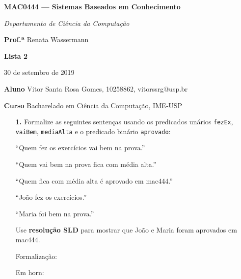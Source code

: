 \documentclass[10pt, twoside]{article}          %
\let\oldphantom\vphantom
\let\vphantom\relax
\let\vphantom\oldphantom
\newcommand{\vghost}[1]{{%
  \delimitershortfall=-1pt
  \vphantom{
    \begingroup
    \lccode`m=`(\relax
    \lowercase\expandafter{\romannumeral#1000}%
    \lccode`m=`)\relax
    \lowercase\expandafter{\romannumeral#1000}%
    \endgroup
  }
}}
\renewcommand{\l}{\mathopen{}\left}             %
\renewcommand{\r}{\vphantom{1j}\right}          %
\newcommand{\triple}[4]{%
  \parbox{.333#4}{#1\hfill}%
  \parbox{.333#4}{\hfil#2\hfil}%
  \parbox{.333#4}{\hfill#3}%
}                                               %
\newenvironment{proof*}[1][proof*]              %
  {\proof[#1]\vspace{0.5em}\vspace*{-\baselineskip}
  \hspace{\parindent}\leftskip=.5cm\rightskip=.5cm}
  {\vspace*{-1.5\baselineskip}
  
  \rightskip=0cm\endproof}
\newenvironment{enumerate*}[1][,]               %
  {\begin{enumerate}[
    itemindent=\leftskip+\parindent, labelindent=\leftskip+\parindent, 
    wide, topsep=0pt,
    label={\bfseries\arabic*.}, labelwidth=10pt, labelindent=\leftskip+\parindent, 
    leftmargin=\leftskip, rightmargin=\rightskip,
    #1
  ]}
  {\end{enumerate}}
\begin{document}
\begin{multicols*}{2}
\setlength{\columnseprule}{0.4pt}

\begin{center}
  \textbf{\large MAC0444 --- Sistemas Baseados em Conhecimento}

  \textit{Departamento de Ciência da Computação}

  \bigskip
  \triple{\textbf{Prof.ª} Renata Wassermann}{\textbf{Lista 2}}{30 de setembro de 2019}{\columnwidth}

  \bigskip
  {\bf Aluno} Vitor Santa Rosa Gomes, 10258862, vitorssrg@usp.br

  {\bf Curso} Bacharelado em Ciência da Computação, IME-USP
\end{center}

\begin{enumerate}
  \renewcommand{\b}{\overline}
  \newcommand{\s}{\smash}
  \newcommand{\lxor}{\mathbin{\,\underline{\!\vee\!}\,}}

  \item[\textbf{1.}] Formalize as seguintes sentenças usando os predicados unários \texttt{fezEx}, 
  \texttt{vaiBem}, \texttt{mediaAlta} e o predicado binário \texttt{aprovado}:

  ``Quem fez os exercícios vai bem na prova.''

  ``Quem vai bem na prova fica com média alta.''

  ``Quem fica com média alta é aprovado em mac444.''

  ``João fez os exercícios.''

  ``Maria foi bem na prova.''

  Use \textbf{resolução SLD} para mostrar que João e Maria foram aprovados em mac444.
  \begin{proof*}[\unskip\nopunct]
    Formalização:

    Em horn:


\end{proof*}
\end{enumerate}
\end{multicols*}
\end{document}
